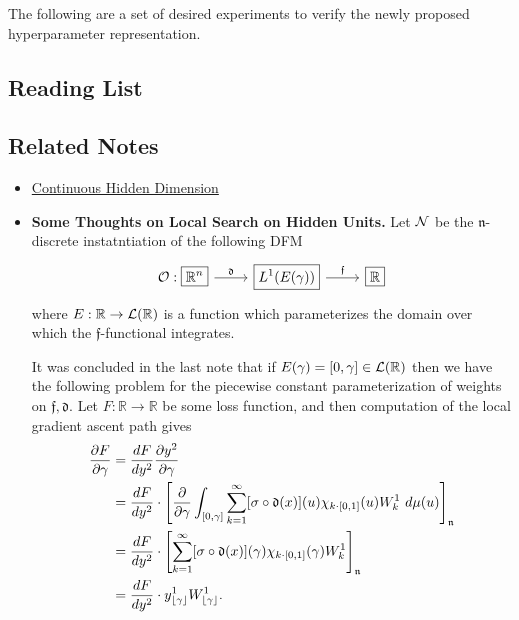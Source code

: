 \documentclass[12pt]{article}
\begin{document}
The following are a set of desired experiments to verify the newly proposed hyperparameter representation.

\subsection{Reading List}





\subsection{Related Notes}

\begin{itemize}
	\item \href{https://github.com/MadcowD/conthyperrep/blob/master/docs/notes/note1.pdf}{Continuous Hidden Dimension}
	\item \textbf{Some Thoughts on Local Search on Hidden Units.} Let ${\mathcal N}$ be the $\mathfrak{n}$-discrete instatntiation of the following DFM
	\begin{equation*}
	\begin{tikzcd}
		\scripto: \boxed{\mathbb{R}^n} \arrow{r}{\mathfrak{d}} & \boxed{L^1(E(\gamma))} \arrow{r}{\mathfrak{f}} & \boxed{\mathbb{R}}
	\end{tikzcd}
	\end{equation*}
	where $E: \mathbb{R} \to {\mathcal L}(\mathbb{R})$ is a function which parameterizes the domain over which the $\mathfrak{f}$-functional integrates.
	

	It was concluded in the last note that if $E(\gamma) = [0, \gamma] \in {\mathcal L}(\mathbb{R})$ then we have the following problem for the piecewise constant
	parameterization of weights on $\mathfrak{f}, \mathfrak{d}.$ Let $F: \mathbb{R} \to \mathbb{R}$ be some loss function, and then computation of the local gradient ascent path
	gives
	\begin{equation*}
	\begin{aligned}
		\frac{\partial F}{\partial \gamma} &= \frac{d F}{d y^2} \frac{\partial y^2}{\partial \gamma} \\
		 &= \frac{d F}{d y^2} \cdot \left[\frac{\partial }{\partial \gamma}  \int_{[0, \gamma]} \sum_{k=1}^\infty  [\sigma \circ \mathfrak{d}(x)](u)  \chi_{k\cdot [0,1]}(u) W^1_{k}\ d\mu(u)   \right]_\mathfrak{n} \\
		 &= \frac{d F}{d y^2} \cdot \left[ \sum_{k=1}^\infty  [\sigma \circ \mathfrak{d}(x)](\gamma)  \chi_{k\cdot [0,1]}(\gamma) W^1_{k}    \right]_\mathfrak{n} \\
		 &= \frac{d F}{d y^2} \cdot  y^1_{\floor*{\gamma}} W^1_{\floor*{\gamma}}.
	\end{aligned}
	\end{equation*}


\end{itemize}
\end{document}
